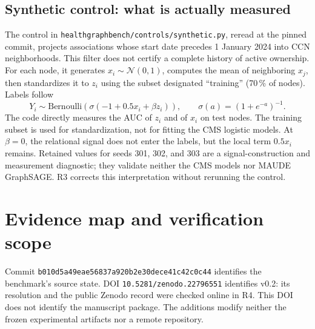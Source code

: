 \documentclass[10pt,a4paper]{article}
\newcommand{\src}[1]{{\small\nolinkurl{#1}}}
\begin{document}
\subsection{Synthetic control: what is actually measured}
\label{supp:control}
The control in \src{healthgraphbench/controls/synthetic.py}, reread at the pinned commit, projects associations whose start date precedes 1 January 2024 into CCN neighborhoods. This filter does not certify a complete history of active ownership. For each node, it generates $x_i\sim\mathcal N(0,1)$, computes the mean of neighboring $x_j$, then standardizes it to $z_i$ using the subset designated “training” (70\,\% of nodes). Labels follow
\[
Y_i\sim\mathrm{Bernoulli}\!\left(\sigma(-1+0.5x_i+\beta z_i)\right),
\qquad \sigma(a)=(1+e^{-a})^{-1}.
\]
The code directly measures the AUC of $z_i$ and of $x_i$ on test nodes. The training subset is used for standardization, not for fitting the CMS logistic models. At $\beta=0$, the relational signal does not enter the labels, but the local term $0.5x_i$ remains. Retained values for seeds 301, 302, and 303 are a signal-construction and measurement diagnostic; they validate neither the CMS models nor MAUDE GraphSAGE\cite{hgbcontrols}. R3 corrects this interpretation without rerunning the control.


\section{Evidence map and verification scope}
\label{supp:evidence}
Commit \nolinkurl{b010d5a49eae56837a920b2e30dece41c42c0c44} identifies the benchmark's source state\cite{hgb2026,hgbresults}. DOI \nolinkurl{10.5281/zenodo.22796551} identifies v0.2: its resolution and the public Zenodo record were checked online in R4. This DOI does not identify the manuscript package. The additions modify neither the frozen experimental artifacts nor a remote repository.
\end{document}
